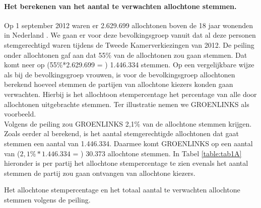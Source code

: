 \paragraph{Het berekenen van het aantal te verwachten allochtone stemmen.}

Op 1 september 2012 waren er 2.629.699 allochtonen boven de 18 jaar wonenden in Nederland \citep{CBS_allochtonen}. We gaan er voor deze bevolkingsgroep vanuit dat al deze personen stemgerechtigd waren tijdens de Tweede Kamerverkiezingen van 2012. De peiling onder allochtonen \citep{Opiniehuis} gaf aan dat 55\% van de allochtonen zou gaan stemmen. Dat komt neer op (55\%*2.629.699 = ) 1.446.334 stemmen. Op een vergelijkbare wijze als bij de bevolkingsgroep vrouwen, is voor de bevolkingsgroep allochtonen berekend hoeveel stemmen de partijen van allochtone kiezers konden gaan verwachten. Hierbij is het allochtoon stempercentage het percentage van alle door allochtonen uitgebrachte stemmen. Ter illustratie nemen we GROENLINKS als voorbeeld. \\
\indent Volgens de peiling zou GROENLINKS 2,1\% van de allochtone stemmen krijgen. Zoals eerder al berekend, is het aantal stemgerechtigde allochtonen dat gaat stemmen een aantal van 1.446.334. Daarmee komt GROENLINKS op een aantal van ($2,1\%*1.446.334$ = ) 30.373 allochtone stemmen. In Tabel \ref{table:tab1A} hieronder is per partij het allochtone stempercentage te zien evenals het aantal stemmen de partij zou gaan ontvangen van allochtone kiezers.  

\begin{table}[H]
\centering
	\begin{footnotesize}
		
	\end{footnotesize}
			\caption{Het allochtone stempercentage en het totaal aantal te verwachten allochtone stemmen volgens de peiling.}
\label{table:tab1A} 
\end{table}


